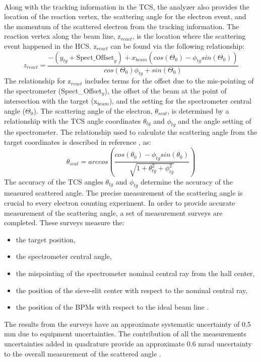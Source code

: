 \paragraph{}Along with the tracking information in the TCS, the analyzer also provides the location of the reaction vertex, the scattering angle for the electron event, and the momentum of the scattered electron from the tracking information. The reaction vertex along the beam line, z$_{react}$, is the location where the scattering event happened in the HCS. z$_{react}$ can be found via the following relationship:
\begin{equation}
z_{react} = \frac{-(y_{tg} + \text{Spect\_Offset}_y) + x_{beam}(cos(\Theta_0) - \phi_{tg}sin(\Theta_0))} {cos(\Theta_0)\phi_{tg} + sin(\Theta_0)}
\end{equation}
The relationship for z$_{react}$ includes terms for the offset due to the mis-pointing of the spectrometer (Spect\_Offset$_y$), the offset of the beam at the point of intersection with the target (x$_{beam}$), and the setting for the spectrometer central angle ($\Theta_0$). The scattering angle of the electron, $\theta_{scat}$, is determined by a relationship with the TCS angle coordinates $\theta_{tg}$ and $\phi_{tg}$ and the angle setting of the spectrometer. The relationship used to calculate the scattering angle from the target coordinates is described in reference \cite{HallA}, as:
\begin{equation}
\theta_{scat} = arccos \left( \frac{cos(\theta_{0})- \phi_{tg}sin(\theta_{0})} {\sqrt{1 + \theta_{tg}^2 + \phi_{tg}^2}} \right) \label{scatangle}
\end{equation}
The accuracy of the TCS angles $\theta_{tg}$ and $\phi_{tg}$ determine the accuracy of the measured scattered angle. The precise measurement of the scattering angle is crucial to every electron counting experiment. In order to provide accurate measurement of the scattering angle, a set of measurement surveys are completed. These surveys measure the:
\begin{itemize}
	\item the target position,
	\item the spectrometer central angle,
	\item the mispointing of the spectrometer nominal central ray from the hall center,
	\item the position of the sieve-slit center with respect to the nominal central ray,
	\item the position of the BPMs with respect to the ideal beam line \cite{HallA}.
\end{itemize} 
The results from the surveys have an approximate systematic uncertainty of 0.5 mm due to equipment uncertainties. The contribution of all the measurements uncertainties added in quadrature provide an approximate 0.6 mrad uncertainty to the overall measurement of the scattered angle \cite{HallA}. 
